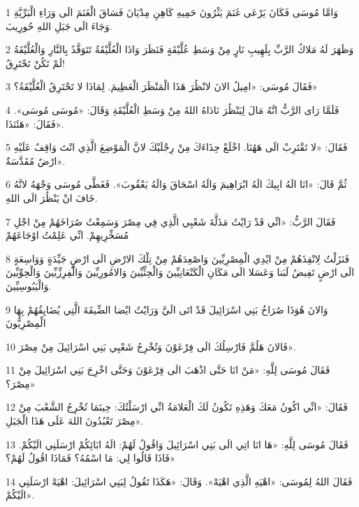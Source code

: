 \par 1 وَامَّا مُوسَى فَكَانَ يَرْعَى غَنَمَ يَثْرُونَ حَمِيهِ كَاهِنِ مِدْيَانَ فَسَاقَ الْغَنَمَ الَى وَرَاءِ الْبَرِّيَّةِ وَجَاءَ الَى جَبَلِ اللهِ حُورِيبَ.
\par 2 وَظَهَرَ لَهُ مَلاكُ الرَّبِّ بِلَهِيبِ نَارٍ مِنْ وَسَطِ عُلَّيْقَةٍ فَنَظَرَ وَاذَا الْعُلَّيْقَةُ تَتَوَقَّدُ بِالنَّارِ وَالْعُلَّيْقَةُ لَمْ تَكُنْ تَحْتَرِقُ!
\par 3 فَقَالَ مُوسَى: «امِيلُ الانَ لانْظُرَ هَذَا الْمَنْظَرَ الْعَظِيمَ. لِمَاذَا لا تَحْتَرِقُ الْعُلَّيْقَةُ؟»
\par 4 فَلَمَّا رَاى الرَّبُّ انَّهُ مَالَ لِيَنْظُرَ نَادَاهُ اللهُ مِنْ وَسَطِ الْعُلَّيْقَةِ وَقَالَ: «مُوسَى مُوسَى». فَقَالَ: «هَئَنَذَا».
\par 5 فَقَالَ: «لا تَقْتَرِبْ الَى هَهُنَا. اخْلَعْ حِذَاءَكَ مِنْ رِجْلَيْكَ لانَّ الْمَوْضِعَ الَّذِي انْتَ وَاقِفٌ عَلَيْهِ ارْضٌ مُقَدَّسَةٌ».
\par 6 ثُمَّ قَالَ: «انَا الَهُ ابِيكَ الَهُ ابْرَاهِيمَ وَالَهُ اسْحَاقَ وَالَهُ يَعْقُوبَ». فَغَطَّى مُوسَى وَجْهَهُ لانَّهُ خَافَ انْ يَنْظُرَ الَى اللهِ.
\par 7 فَقَالَ الرَّبُّ: «انِّي قَدْ رَايْتُ مَذَلَّةَ شَعْبِي الَّذِي فِي مِصْرَ وَسَمِعْتُ صُرَاخَهُمْ مِنْ اجْلِ مُسَخِّرِيهِمْ. انِّي عَلِمْتُ اوْجَاعَهُمْ
\par 8 فَنَزَلْتُ لِانْقِذَهُمْ مِنْ ايْدِي الْمِصْرِيِّينَ وَاصْعِدَهُمْ مِنْ تِلْكَ الارْضِ الَى ارْضٍ جَيِّدَةٍ وَوَاسِعَةٍ الَى ارْضٍ تَفِيضُ لَبَنا وَعَسَلا الَى مَكَانِ الْكَنْعَانِيِّينَ وَالْحِثِّيِّينَ وَالامُورِيِّينَ وَالْفِرِزِّيِّينَ وَالْحِوِّيِّينَ وَالْيَبُوسِيِّينَ.
\par 9 وَالانَ هُوَذَا صُرَاخُ بَنِي اسْرَائِيلَ قَدْ اتَى الَيَّ وَرَايْتُ ايْضا الضِّيقَةَ الَّتِي يُضَايِقُهُمْ بِهَا الْمِصْرِيُّونَ
\par 10 فَالانَ هَلُمَّ فَارْسِلُكَ الَى فِرْعَوْنَ وَتُخْرِجُ شَعْبِي بَنِي اسْرَائِيلَ مِنْ مِصْرَ».
\par 11 فَقَالَ مُوسَى لِلَّهِ: «مَنْ انَا حَتَّى اذْهَبَ الَى فِرْعَوْنَ وَحَتَّى اخْرِجَ بَنِي اسْرَائِيلَ مِنْ مِصْرَ؟»
\par 12 فَقَالَ: «انِّي اكُونُ مَعَكَ وَهَذِهِ تَكُونُ لَكَ الْعَلامَةُ انِّي ارْسَلْتُكَ: حِينَمَا تُخْرِجُ الشَّعْبَ مِنْ مِصْرَ تَعْبُدُونَ اللهَ عَلَى هَذَا الْجَبَلِ».
\par 13 فَقَالَ مُوسَى لِلَّهِ: «هَا انَا اتِي الَى بَنِي اسْرَائِيلَ وَاقُولُ لَهُمْ: الَهُ ابَائِكُمْ ارْسَلَنِي الَيْكُمْ. فَاذَا قَالُوا لِي: مَا اسْمُهُ؟ فَمَاذَا اقُولُ لَهُمْ؟»
\par 14 فَقَالَ اللهُ لِمُوسَى: «اهْيَهِ الَّذِي اهْيَهْ». وَقَالَ: «هَكَذَا تَقُولُ لِبَنِي اسْرَائِيلَ: اهْيَهْ ارْسَلَنِي الَيْكُمْ».
